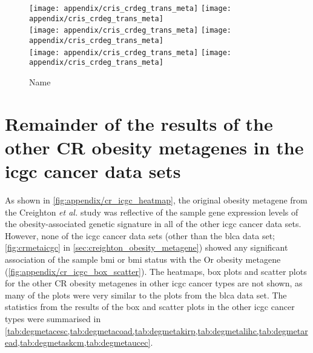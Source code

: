 \begin{appendices}
	\begin{figure}[htpb]
		\ContinuedFloat
		\captionsetup{list=off,format=cont}
		\centering
		\texttt{[image: appendix/cris\_crdeg\_trans\_meta]}
		\hfill
		\texttt{[image: appendix/cris\_crdeg\_trans\_meta]}\\
		\texttt{[image: appendix/cris\_crdeg\_trans\_meta]}
		\hfill
		\texttt{[image: appendix/cris\_crdeg\_trans\_meta]}\\
		\texttt{[image: appendix/cris\_crdeg\_trans\_meta]}
		\hfill
		\texttt{[image: appendix/cris\_crdeg\_trans\_meta]}\\
		\caption{Name}
	\end{figure}

	\section{Remainder of the results of the other CR obesity metagenes in the \gls{icgc} cancer data sets}
	\label{sec:rest_of_the_cr_icgc_cancer_heatmap_results}

	As shown in \cref{fig:appendix/cr_icgc_heatmap}, the original obesity metagene from the Creighton \textit{et al.} study was reflective of the sample gene expression levels of the obesity-associated genetic signature in all of the other \gls{icgc} cancer data sets.
	However, none of the \gls{icgc} cancer data sets (other than the \gls{blca} data set; \cref{fig:crmetaicgc} in \cref{sec:creighton_obesity_metagene}) showed any significant association of the sample \gls{bmi} or \gls{bmi} status with the Or obesity metagene (\cref{fig:appendix/cr_icgc_box_scatter}).
	The heatmaps, box plots and scatter plots for the other CR obesity metagenes in other \gls{icgc} cancer types are not shown, as many of the plots were very similar to the plots from the \gls{blca} data set.
	The statistics from the results of the box and scatter plots in the other \gls{icgc} cancer types were summarised in \cref{tab:degmetacesc,tab:degmetacoad,tab:degmetakirp,tab:degmetalihc,tab:degmetaread,tab:degmetaskcm,tab:degmetaucec}.


\end{appendices}
